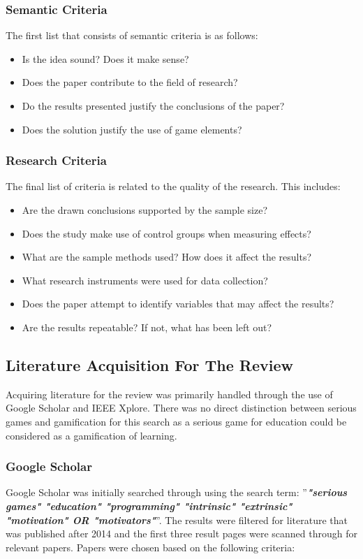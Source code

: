 \subsubsection{Semantic Criteria}
The first list that consists of semantic criteria is as follows: 
\begin{itemize}
    \item Is the idea sound? Does it make sense?
    \item Does the paper contribute to the field of research?
    \item Do the results presented justify the conclusions of the paper?
    \item Does the solution justify the use of game elements?
\end{itemize}

\subsubsection{Research Criteria}
The final list of criteria is related to the quality of the research. This includes: 
\begin{itemize}
    \item Are the drawn conclusions supported by the sample size?
    \item Does the study make use of control groups when measuring effects?
    \item What are the sample methods used? How does it affect the results?
    \item What research instruments were used for data collection?
    \item Does the paper attempt to identify variables that may affect the results?
    \item Are the results repeatable? If not, what has been left out?
\end{itemize}

\subsection{Literature Acquisition For The Review}
Acquiring literature for the review was primarily handled through the use of Google Scholar and IEEE Xplore. There was no direct distinction between serious games and gamification for this search as a serious game for education could be considered as a gamification of learning. 

\subsubsection{Google Scholar}
Google Scholar was initially searched through using the search term: ''\textbf{\emph{"serious games" "education" "programming" "intrinsic" "extrinsic" "motivation" OR "motivators"}}''. The results were filtered for literature that was published after 2014 and the first three result pages were scanned through for relevant papers. Papers were chosen based on the following criteria: 

